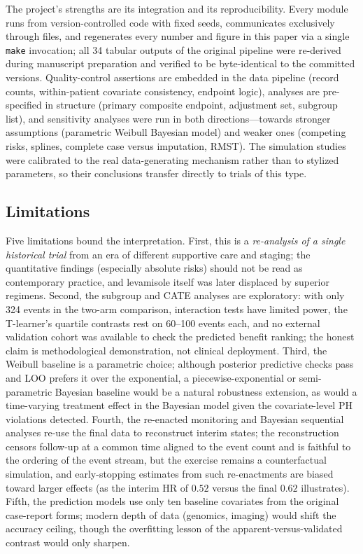 The project's strengths are its integration and its reproducibility.
Every module runs from version-controlled code with fixed seeds,
communicates exclusively through files, and regenerates every number and
figure in this paper via a single \texttt{make} invocation; all 34
tabular outputs of the original pipeline were re-derived during
manuscript preparation and verified to be byte-identical to the
committed versions. Quality-control assertions are embedded in the data
pipeline (record counts, within-patient covariate consistency, endpoint
logic), analyses are pre-specified in structure (primary composite
endpoint, adjustment set, subgroup list), and sensitivity analyses were
run in both directions---towards stronger assumptions (parametric
Weibull Bayesian model) and weaker ones (competing risks, splines,
complete case versus imputation, RMST). The simulation studies were
calibrated to the real data-generating mechanism rather than to
stylized parameters, so their conclusions transfer directly to trials of
this type.

\subsection{Limitations}

Five limitations bound the interpretation. First, this is a
\emph{re-analysis of a single historical trial} from an era of different
supportive care and staging; the quantitative findings (especially
absolute risks) should not be read as contemporary practice, and
levamisole itself was later displaced by superior regimens. Second, the
subgroup and CATE analyses are exploratory: with only 324 events in the
two-arm comparison, interaction tests have limited power, the T-learner's
quartile contrasts rest on 60--100 events each, and no external
validation cohort was available to check the predicted benefit ranking;
the honest claim is methodological demonstration, not clinical
deployment. Third, the Weibull baseline is a parametric choice; although
posterior predictive checks pass and LOO prefers it over the
exponential, a piecewise-exponential or semi-parametric Bayesian
baseline would be a natural robustness extension, as would a
time-varying treatment effect in the Bayesian model given the
covariate-level PH violations detected. Fourth, the re-enacted
monitoring and Bayesian sequential analyses re-use the final data to
reconstruct interim states; the reconstruction censors follow-up at a
common time aligned to the event count and is faithful to the ordering
of the event stream, but the exercise remains a counterfactual
simulation, and early-stopping estimates from such re-enactments are
biased toward larger effects (as the interim HR of $0.52$ versus the
final $0.62$ illustrates). Fifth, the prediction models use only ten
baseline covariates from the original case-report forms; modern depth of
data (genomics, imaging) would shift the accuracy ceiling, though the
overfitting lesson of the apparent-versus-validated contrast would only
sharpen.

